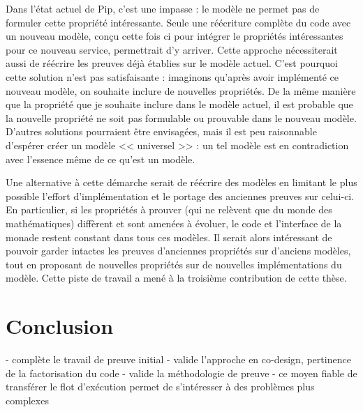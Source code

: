 		Dans l'état actuel de Pip, c'est une impasse : le modèle ne permet pas de formuler cette propriété intéressante. Seule une réécriture complète du code avec un nouveau modèle, conçu cette fois ci pour intégrer le propriétés intéressantes pour ce nouveau service, permettrait d'y arriver. Cette approche nécessiterait aussi de réécrire les preuves déjà établies sur le modèle actuel.
		C'est pourquoi cette solution n'est pas satisfaisante : imaginons qu'après avoir implémenté ce nouveau modèle, on souhaite inclure de nouvelles propriétés. De la même manière que la propriété que je souhaite inclure dans le modèle actuel, il est probable que la nouvelle propriété ne soit pas formulable ou prouvable dans le nouveau modèle. D'autres solutions pourraient être envisagées, mais il est peu raisonnable d'espérer créer un modèle << universel >> : un tel modèle est en contradiction avec l'essence même de ce qu'est un modèle.

		Une alternative à cette démarche serait de réécrire des modèles en limitant le plus possible l'effort d'implémentation et le portage des anciennes preuves sur celui-ci. En particulier, si les propriétés à prouver (qui ne relèvent que du monde des mathématiques) diffèrent et sont amenées à évoluer, le code et l'interface de la monade restent constant dans tous ces modèles. Il serait alors intéressant de pouvoir garder intactes les preuves d'anciennes propriétés sur d'anciens modèles, tout en proposant de nouvelles propriétés sur de nouvelles implémentations du modèle. Cette piste de travail a mené à la troisième contribution de cette thèse. 

	\section{Conclusion}
	- complète le travail de preuve initial
	- valide l'approche en co-design, pertinence de la factorisation du code
	- valide la méthodologie de preuve
	- ce moyen fiable de transférer le flot d'exécution permet de s'intéresser à des problèmes plus complexes
